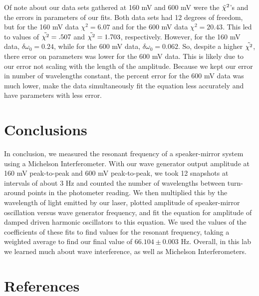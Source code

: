 \documentclass[11pt,letterpaper]{article}
\begin{document}
Of note about our data sets gathered at 160 mV and 600 mV were the $\Tilde{\chi} ^2$'s and the errors in parameters of our fits. Both data sets had 12 degrees of freedom, but for the 160 mV data $\chi ^2 = 6.07$ and for the 600 mV data $\chi ^2 = 20.43$. This led to values of $\Tilde{\chi ^2} = .507$ and $\Tilde{\chi ^2} = 1.703$, respectively. However, for the 160 mV data, $\delta \omega _0 = 0.24$, while for the 600 mV data, $\delta \omega _0 = 0.062$. So, despite a higher $\Tilde{\chi ^2}$, there error on parameters was lower for the 600 mV data. This is likely due to our error not scaling with the length of the amplitude. Because we kept our error in number of wavelengths constant, the percent error for the 600 mV data was much lower, make the data simultaneously fit the equation less accurately and have parameters with less error.


\section{Conclusions}

In conclusion, we measured the resonant frequency of a speaker-mirror system using a Michelson Interferometer. With our wave generator output amplitude at 160 mV peak-to-peak and 600 mV peak-to-peak, we took 12 snapshots at intervals of about 3 Hz and counted the number of wavelengths between turn-around points in the photometer reading. We then multiplied this by the wavelength of light emitted by our laser, plotted amplitude of speaker-mirror oscillation versus wave generator frequency, and fit the equation for amplitude of damped driven harmonic oscillators to this equation. We used the values of the coefficients of these fits to find values for the resonant frequency, taking a weighted average to find our final value of $66.104 \pm 0.003$ Hz. Overall, in this lab we learned much about wave interference, as well as Michelson Interferometers. 


\section{References}
\end{document}
